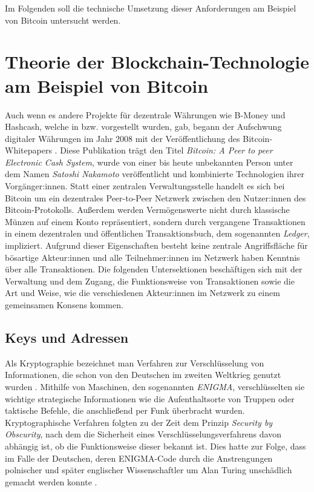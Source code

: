 Im Folgenden soll die technische Umsetzung dieser Anforderungen am Beispiel von Bitcoin untersucht werden.
\section{Theorie der Blockchain-Technologie am Beispiel von Bitcoin}
Auch wenn es andere Projekte für dezentrale Währungen wie B-Money und Hashcash, welche in \cite{dai_1998} bzw. \cite{back_2002} vorgestellt wurden, gab, begann der Aufschwung digitaler Währungen im Jahr 2008 mit der Veröffentlichung des Bitcoin-Whitepapers  \cite{nakamoto_whitepaper_2008}. Diese Publikation trägt den Titel \emph{Bitcoin: A Peer to peer Electronic Cash System}, wurde von einer bis heute unbekannten Person unter dem Namen \emph{Satoshi Nakamoto} veröffentlicht und kombinierte Technologien ihrer Vorgänger:innen. Statt einer zentralen Verwaltungsstelle handelt es sich bei Bitcoin um ein dezentrales Peer-to-Peer Netzwerk zwischen den Nutzer:innen des Bitcoin-Protokolls. Außerdem werden Vermögenswerte nicht durch klassische Münzen auf einem Konto repräsentiert, sondern durch vergangene Transaktionen in einem dezentralen und öffentlichen Transaktionsbuch, dem sogenannten \emph{Ledger}, impliziert. Aufgrund dieser Eigenschaften besteht keine zentrale Angriffsfläche für bösartige Akteur:innen und alle Teilnehmer:innen im Netzwerk haben Kenntnis über alle Transaktionen. Die folgenden Untersektionen beschäftigen sich mit der Verwaltung und dem Zugang, die Funktionsweise von Transaktionen sowie die Art und Weise, wie die verschiedenen Akteur:innen im Netzwerk zu einem gemeinsamen Konsens kommen.
\subsection{Keys und Adressen}
Als Kryptographie bezeichnet man Verfahren zur Verschlüsselung von Informationen, die schon von den Deutschen im zweiten Weltkrieg genutzt wurden \cite[S. 19]{landwehr_2008}. 
Mithilfe von Maschinen, den sogenannten \emph{ENIGMA}, verschlüsselten sie wichtige strategische Informationen wie die Aufenthaltsorte von Truppen oder taktische Befehle, die anschließend per Funk überbracht wurden.
Kryptographische Verfahren folgten zu der Zeit dem Prinzip \emph{Security by Obscurity}, nach dem die Sicherheit eines Verschlüsselungsverfahrens davon abhängig ist, ob die Funktionsweise dieser bekannt ist. 
Dies hatte zur Folge, dass im Falle der Deutschen, deren ENIGMA-Code durch die Anstrengungen polnischer und später englischer Wissenschaftler um Alan Turing unschädlich gemacht werden konnte \cite[S. 18/19]{landwehr_2008}.\\

